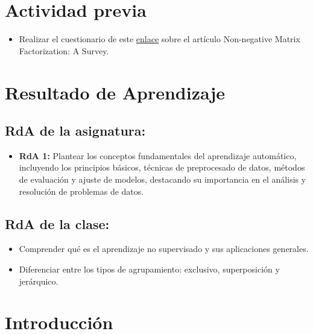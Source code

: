 \documentclass[a4,11pt]{aleph-notas}
\begin{document}
\encabezado

\section*{Actividad previa}

\begin{itemize}
    \item Realizar el cuestionario de este \href{https://gemini.google.com/share/dfb8770d963d}{enlace} sobre el artículo Non-negative Matrix Factorization: A Survey.
\end{itemize}


\section*{Resultado de Aprendizaje}

\subsection*{RdA de la asignatura:}
\begin{itemize}[leftmargin=*]
    \item \textbf{RdA 1:} Plantear los conceptos fundamentales del aprendizaje automático, incluyendo los principios básicos, técnicas de preprocesado de datos, métodos de evaluación y ajuste de modelos, destacando su importancia en el análisis y resolución de problemas de datos.
\end{itemize}

\subsection*{RdA de la clase:}
\begin{itemize}[leftmargin=*]
    \item Comprender qué es el aprendizaje no supervisado y sus aplicaciones generales.
    \item Diferenciar entre los tipos de agrupamiento: exclusivo, superposición y jerárquico.
\end{itemize}

\section*{Introducción}
\end{document}
